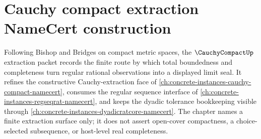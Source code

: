 \chapter{Cauchy compact extraction NameCert construction}
\label{ch:concrete-instances-cauchy-compact-extraction-namecert}

Following Bishop and Bridges on compact metric spaces, the $\CauchyCompactUp$ extraction packet records the finite route by which total boundedness and completeness turn regular rational observations into a displayed limit seal. It refines the constructive Cauchy-extraction face of \autoref{ch:concrete-instances-cauchy-compact-namecert}, consumes the regular sequence interface of \autoref{ch:concrete-instances-regseqrat-namecert}, and keeps the dyadic tolerance bookkeeping visible through \autoref{ch:concrete-instances-dyadicratcore-namecert}. The chapter names a finite extraction surface only; it does not assert open-cover compactness, a choice-selected subsequence, or host-level real completeness.

